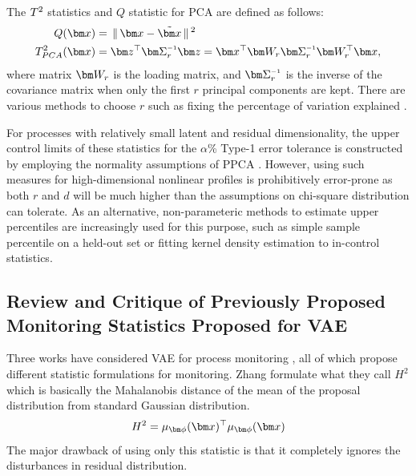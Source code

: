 \documentclass{scrartcl}
\theoremstyle{definition}
\begin{document}
The $ T^{2} $ statistics and $ Q $ statistic for PCA are defined as follows:
\begin{equation}
\begin{split}
	Q(\mbx) &= \gg \mbx - \tilde{\mbx} \gg^2 \\
	\Tsq_{PCA}(\mbx) &= \mbz^\top \mbSigma\inv_{r} \mbz = \mbx^\top \mbW_{r} \mbSigma\inv_{r} \mbW^\top_{r} \mbx,
\end{split}
\label{eqn: QTPCA}
\end{equation}
where matrix $ \mbW_{r} $ is the loading matrix, and $ \mbSigma\inv_{r} $ is the inverse of the covariance matrix when only the first $r$ principal components are kept. 
There are various methods to choose $r$ such as fixing the percentage of variation explained \parencite[p. 41]{Chiang2001-nu}.

For processes with relatively small latent and residual dimensionality, the upper control limits of these statistics for the $\alpha$\% Type-1 error tolerance is constructed by employing the normality assumptions of PPCA \parencite[p. 43-44]{Chiang2001-nu}.
However, using such measures for high-dimensional nonlinear profiles is prohibitively error-prone as both $r$ and $d$ will be much higher than the assumptions on chi-square distribution can tolerate.
As an alternative, non-parameteric methods to estimate upper percentiles are increasingly used for this purpose, such as simple sample percentile on a held-out set or fitting kernel density estimation to in-control statistics.

\subsection{Review and Critique of Previously Proposed Monitoring Statistics Proposed for VAE}
\label{sec:bckgrnd:critique}
Three works have considered VAE for process monitoring \parencite{wang2019systematic, Zhang2019-lu, lee2019process}, all of which propose different statistic formulations for monitoring.
Zhang \etal \parencite{Zhang2019-lu} formulate what they call $H^2$ which is basically the Mahalanobis distance of the mean of the proposal distribution from standard Gaussian distribution.
\begin{equation}
    H^2 = \mu_{\mbphi}(\mbx)^{\top}\mu_{\mbphi}(\mbx)
\end{equation}
The major drawback of using only this statistic is that it completely ignores the disturbances in residual distribution.
\end{document}
